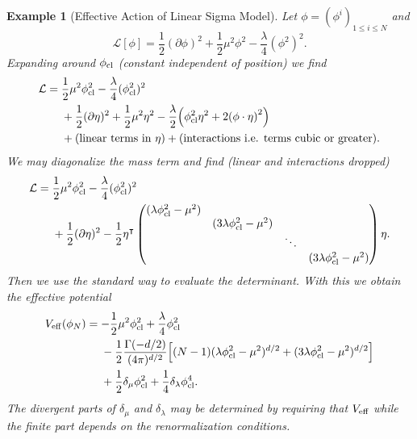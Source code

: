 \documentclass{article}
\newtheorem{myex}{Example}
\begin{document}
\begin{myex}[Effective Action of Linear Sigma Model]
    Let $\phi = (\phi^i)_{1\le i \le N}$ and
    \[ \mathcal{L}[\phi] = \frac{1}{2}(\partial \phi)^2 + \frac{1}{2}\mu^2 \phi^2 - \frac{\lambda}{4}(\phi^2)^2. \]
    Expanding around $\phi_{\textnormal{cl}}$ (constant independent of position) we find
    \begin{align*}
        \mathcal{L} &= \frac{1}{2}\mu^2 \phi_{\textnormal{cl}}^2 - \frac{\lambda}{4}(\phi_{\textnormal{cl}}^2)^2 \\
        &{\phantom{{}={}}} + \frac{1}{2} (\partial \eta)^2 + \frac{1}{2}\mu^2 \eta^2 - \frac{\lambda}{2}\qty(\phi^2_{\textnormal{cl}} \eta^2 + 2\qty(\phi\cdot \eta)^2) \\
        &{\phantom{{}={}}} + \qty(\text{linear terms in }\eta) + \qty(\text{interactions i.e. terms cubic or greater}).
    \end{align*}
    We may diagonalize the mass term and find (linear and interactions dropped)
    \begin{align*}
        \mathcal{L} &= \frac{1}{2}\mu^2 \phi_{\textnormal{cl}}^2 - \frac{\lambda}{4}(\phi_{\textnormal{cl}}^2)^2 \\
        &{\phantom{{}={}}} + \frac{1}{2}(\partial \eta)^2  - \frac{1}{2}\eta^\intercal \begin{pmatrix}
            (\lambda \phi^2_{\textnormal{cl}} - \mu^2) & & & \\
            & (3\lambda \phi^2_{\textnormal{cl}} - \mu^2) & & \\
            & & \ddots \\
            & & & (3\lambda \phi^2_{\textnormal{cl}} - \mu^2)
        \end{pmatrix}\eta.
    \end{align*}
    Then we use the standard way to evaluate the determinant.
    With this we obtain the effective potential
    \begin{align*}
        V_{\mathrm{eff}}(\phi_N) &= -\frac{1}{2} \mu^2 \phi^2_{\textnormal{cl}} + \frac{\lambda}{4} \phi^2_{\textnormal{cl}} \\
        &{\phantom{{}={}}} -\frac{1}{2} \frac{\Gamma(-d/2)}{(4\pi)^{d/2}}\qty[(N-1)(\lambda \phi^2_{\textnormal{cl}} - \mu^2)^{d/2} + (3\lambda \phi^2_{\textnormal{cl}} - \mu^2)^{d/2}] \\
        &{\phantom{{}={}}} + \frac{1}{2}\delta_\mu \phi^2_{\textnormal{cl}} + \frac{1}{4} \delta_\lambda \phi^4_{\textnormal{cl}}.
    \end{align*}
    The divergent parts of $\delta_\mu$ and $\delta_\lambda$ may be determined by requiring that $V_{\textnormal{eff}}$ while the finite part depends on the renormalization conditions.
\end{myex}
\end{document}
